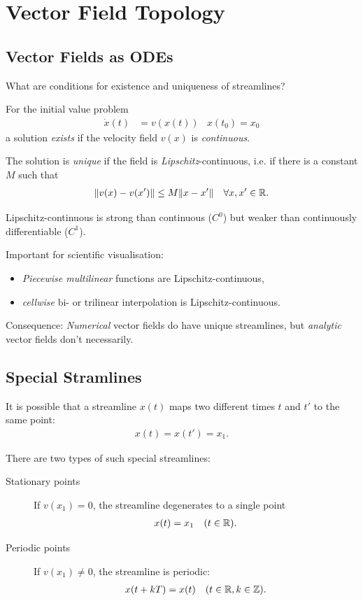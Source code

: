 \section{Vector Field Topology}


\subsection{Vector Fields as ODEs}
What are conditions for existence and uniqueness of streamlines?

\begin{description}
    \item For the initial value problem
        \begin{align*}
            \dot x(t) &= v(x(t)) &x(t_0) = x_0
        \end{align*}
        a solution \emph{exists} if the velocity field $v(x)$ is \emph{continuous}.
    \item The solution is \emph{unique} if the field is \emph{Lipschitz}-continuous, i.e. if there is a constant $M$ such that 
        \begin{align*}
            \norm{v(x)-v(x')} &\leq M\norm{x-x'} & \forall x,x' \in \R.
        \end{align*}
\end{description}

Lipschitz-continuous is strong than continuous ($C^0$) but weaker than continuously differentiable ($C^1$).

Important for scientific visualisation:
\begin{itemize}
    \item \emph{Piecewise multilinear} functions are Lipschitz-continuous,
    \item \emph{cellwise} bi- or trilinear interpolation is Lipschitz-continuous.
\end{itemize}

Consequence: \emph{Numerical} vector fields do have unique streamlines, but \emph{analytic} vector fields don't necessarily.

\subsection{Special Stramlines}
It is possible that a streamline $x(t)$ maps two different times $t$ and $t'$ to the same point:
\begin{align*}
    x(t) = x(t') = x_1.
\end{align*}

There are two types of such special streamlines:
\begin{description}
\item[Stationary points] If $v(x_1) = 0$, the streamline degenerates to a single point
    \begin{align*}
        x(t) &= x_1 &(t\in \mathbb{R}).
    \end{align*}
\item[Periodic points] If $v(x_1)\neq 0$, the streamline is periodic:
    \begin{align*}
        x(t+kT) &= x(t) &(t\in \mathbb{R}, k\in \mathbb{Z}).
    \end{align*}
\end{description}

